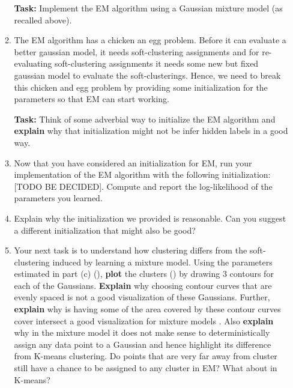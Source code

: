 \begin{enumerate}
\begin{enumerate}
    \textbf{Task:} Implement the EM algorithm using a Gaussian mixture model (as recalled above).

\item The EM algorithm has a chicken an egg problem. Before it can evaluate a better gaussian model, it needs soft-clustering assignments and for re-evaluating soft-clustering assignments it needs some new but fixed gaussian model to evaluate the soft-clusterings. Hence, we need to break this chicken and egg problem by providing some initialization for the parameters so that EM can start working. 

	\textbf{Task:} Think of some adverbial way to initialize the EM algorithm and \textbf{explain} why that initialization might not be infer hidden labels in a good way.

\item Now that you have considered an initialization for EM, run your implementation of the EM algorithm with the following initialization: [TODO BE DECIDED]. Compute and report the log-likelihood of the parameters you learned. 


\item Explain why the initialization we provided is reasonable. Can you suggest a different initialization that might also be good?

\item Your next task is to understand how  clustering differs from the soft-clustering induced by learning a mixture model. Using the parameters estimated in part (c) (), \textbf{plot} the clusters () by drawing 3 contours for each of the  Gaussians. \textbf{Explain} why choosing contour curves that are evenly spaced is not a good visualization of these Gaussians. Further, \textbf{explain} why is having some of the area covered by these contour curves cover intersect a good visualization for mixture models . Also \textbf{explain} why in the mixture model it does not make sense to deterministically assign any data point to a Gaussian and hence highlight its difference from K-means clustering. Do points that are very far away from cluster  still have a chance to be assigned to any cluster in EM? What about in K-means?


\end{enumerate}
\end{enumerate}
